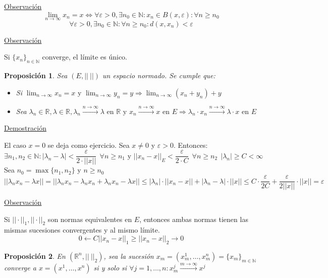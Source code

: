 \documentclass[10pt,a4paper,openright]{book}
\theoremstyle{break}
\newtheorem*{prop}{Proposición}
\begin{document}
\underline{Observación}
$$\lim_{n \to \infty} x_n = x \Leftrightarrow \forall \varepsilon > 0, \exists n_0 \in \mathbb{N} : x_n \in B(x, \varepsilon) : \forall n \geq n_0$$
$$\forall \varepsilon > 0, \exists n_0 \in \mathbb{N} : \forall n \geq n_0 : d(x,x_n) < \varepsilon$$

\underline{Observación}

Si $\{x_n\}_{n \in \mathbb{N}}$ converge, el límite es único.

\begin{prop}
Sea $(E, || \ ||)$ un espacio normado. Se cumple que:
\begin{itemize}
\item Si $\lim_{n \to \infty} x_n = x \mbox{ y } \lim_{n \to \infty} y_n = y \Rightarrow \lim_{n \to \infty} (x_n + y_n) + y$

\item Sea $\lambda_n \in \mathbb{R}, \lambda \in \mathbb{R}, \lambda_n \xrightarrow{n\rightarrow\infty} \lambda \mbox{ en $\mathbb{R}$} \mbox{ y } x_n \xrightarrow{n\rightarrow\infty} x \mbox{ en $E$} \Rightarrow \lambda_n \cdot x_n \xrightarrow{n\rightarrow\infty} \lambda \cdot x \mbox{ en $E$}$
\end{itemize}
\end{prop}

\underline{Demostración}

El caso $x = 0$ se deja como ejercicio. Sea $x \neq 0$ y $\varepsilon > 0$. Entonces:
$$\exists n_1, n_2 \in \mathbb{N} : | \lambda_n - \lambda | < \frac{\varepsilon}{2 \cdot ||x||} \ \ \forall n \geq n_1 \mbox{ y } ||x_n - x||_E < \frac{\varepsilon}{2 \cdot C} \ \ \forall n \geq n_2 \ \ |\lambda_n| \geq C < \infty$$
Sea $n_0 = \max\{n_1, n_2\}$ y $n \geq n_0$
$$||\lambda_n x_n - \lambda x || = ||\lambda_n x_n - \lambda_n x_n + \lambda_n x_n - \lambda x || \leq |\lambda_n| \cdot ||x_n - x|| + |\lambda_n - \lambda | \cdot ||x|| \leq C \cdot \frac{\varepsilon}{2C} + \frac{\varepsilon}{2||x||}\cdot ||x|| = \varepsilon$$

\underline{Observación}

Si $||\cdot||_1, ||\cdot||_2$ son normas equivalentes en $E$, entonces ambas normas tienen las mismas sucesiones convergentes y al mismo límite.
$$0 \leftarrow C||x_n - x||_1 \geq ||x_n - x||_2 \to 0$$

\begin{prop}
En $(\mathbb{R}^n, || \ ||_2)$, sea la sucesión $x_m = (x_m^1, \ldots, x_m^n) = \{x_m\}_{m \in  \mathbb{N}}$ converge a $x = (x^1, \ldots, x^n)$ si y solo si $\forall j = 1, \ldots, n: x_m^j \xrightarrow{m\rightarrow\infty} x^j$
\end{prop}
\end{document}
